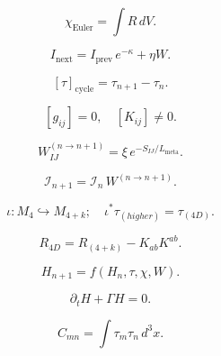\[
\chi_{\mathrm{Euler}} = \int R\, dV.
\]

\[
I_{\mathrm{next}} = I_{\mathrm{prev}}\, e^{-\kappa} + \eta W.
\]

\[
[\tau]_{\mathrm{cycle}} = \tau_{n+1} - \tau_n.
\]

\[
[g_{ij}] = 0,\quad [K_{ij}] \neq 0.
\]

\[
W^{(n\rightarrow n+1)}_{IJ} = \xi\, e^{-S_{IJ}/L_{\mathrm{meta}}}.
\]

\[
\mathcal{I}_{n+1} = \mathcal{I}_{n}\,W^{(n\rightarrow n+1)}.
\]

\[
\iota: M_4 \hookrightarrow M_{4+k};\quad \iota^\ast \tau_{(higher)} = \tau_{(4D)}.
\]

\[
R_{4D} = R_{(4+k)} - K_{ab}K^{ab}.
\]

\[
H_{n+1} = f(H_n,\tau,\chi,W).
\]

\[
\partial_t H + \Gamma H = 0.
\]

\[
C_{mn} = \int \tau_m \tau_n\, d^3x.
\]

